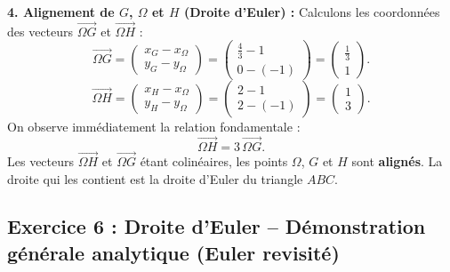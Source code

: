 \documentclass[11pt,a4paper]{article}
\newcommand{\vect}[1]{\overrightarrow{#1}}
\begin{document}
\begin{correctionbox}
\textbf{4. Alignement de $G$, $\Omega$ et $H$ (Droite d'Euler) :}
Calculons les coordonnées des vecteurs $\vect{\Omega G}$ et $\vect{\Omega H}$ :
\[
\vect{\Omega G} = \begin{pmatrix} x_G - x_\Omega \\ y_G - y_\Omega \end{pmatrix} = \begin{pmatrix} \frac{4}{3} - 1 \\ 0 - (-1) \end{pmatrix} = \begin{pmatrix} \frac{1}{3} \\ 1 \end{pmatrix}.
\]
\[
\vect{\Omega H} = \begin{pmatrix} x_H - x_\Omega \\ y_H - y_\Omega \end{pmatrix} = \begin{pmatrix} 2 - 1 \\ 2 - (-1) \end{pmatrix} = \begin{pmatrix} 1 \\ 3 \end{pmatrix}.
\]
On observe immédiatement la relation fondamentale :
\[
\vect{\Omega H} = 3\,\vect{\Omega G}.
\]
Les vecteurs $\vect{\Omega H}$ et $\vect{\Omega G}$ étant colinéaires, les points $\Omega$, $G$ et $H$ sont \textbf{alignés}. La droite qui les contient est la droite d'Euler du triangle $ABC$.
\end{correctionbox}

\newpage
\subsection*{Exercice 6 : Droite d'Euler -- Démonstration générale analytique (Euler revisité)}
\end{document}
